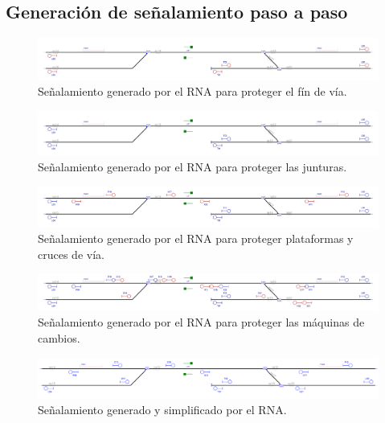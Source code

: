 \subsection{Generación de señalamiento paso a paso}

\lipsum[1]

\begin{figure}[H]
	\centering
	\includegraphics[width=1\textwidth]{resultados-obtenidos/ejemplo2/images/2_step1.png}
	\centering\caption{Señalamiento generado por el RNA para proteger el fín de vía.}
\end{figure}

\lipsum[1]

\begin{figure}[H]
	\centering
	\includegraphics[width=1\textwidth]{resultados-obtenidos/ejemplo2/images/2_step2.png}
	\centering\caption{Señalamiento generado por el RNA para proteger las junturas.}
\end{figure}

\lipsum[1]

\begin{figure}[H]
	\centering
	\includegraphics[width=1\textwidth]{resultados-obtenidos/ejemplo2/images/2_step3.png}
	\centering\caption{Señalamiento generado por el RNA para proteger plataformas y cruces de vía.}
\end{figure}

\lipsum[1]

 \begin{figure}[H]
	\centering
	\includegraphics[width=1\textwidth]{resultados-obtenidos/ejemplo2/images/2_step4.png}
	\centering\caption{Señalamiento generado por el RNA para proteger las máquinas de cambios.}
\end{figure}

\lipsum[1]

 \begin{figure}[H]
	\centering
	\includegraphics[width=1\textwidth]{resultados-obtenidos/ejemplo2/images/2_RNA.png}
	\centering\caption{Señalamiento generado y simplificado por el RNA.}
\end{figure}

\lipsum[1]